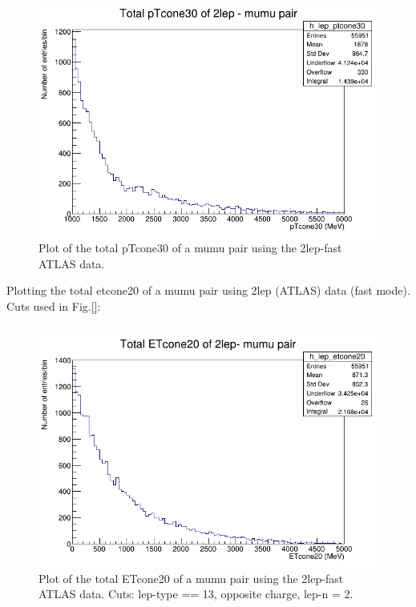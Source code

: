 \begin{figure}[h!]
    \centering
	\includegraphics[width=0.85\linewidth]{plots/16-02-2021/2lep_fast_mumu-pair_pTcone30(total)_1-6GeV_16-02-21_11-06.png}
	\caption{Plot of the total pTcone30 of a mumu pair using the 2lep-fast ATLAS data. }\label{fig:2lep_fast_mumu-pair_pTcone30(total)_1-6GeV_16-02-21_11-06}
\end{figure}

Plotting the total etcone20 of a mumu pair using 2lep (ATLAS) data (fast mode).
\\
Cuts used in Fig.\ref{}:
\begin{lstlisting}

\end{lstlisting}
\begin{figure}[h!]
    \centering
	\includegraphics[width=0.85\linewidth]{plots/16-02-2021/2lep_fast_mumu-pair_ETcone30(total)_0-5GeV_16-02-21_11-14.png}
	\caption{Plot of the total ETcone20 of a mumu pair using the 2lep-fast ATLAS data. Cuts: lep-type == 13, opposite charge, lep-n = 2.  }\label{fig:2lep_fast_mumu-pair_ETcone30(total)_0-5GeV_16-02-21_11-14}
\end{figure}



